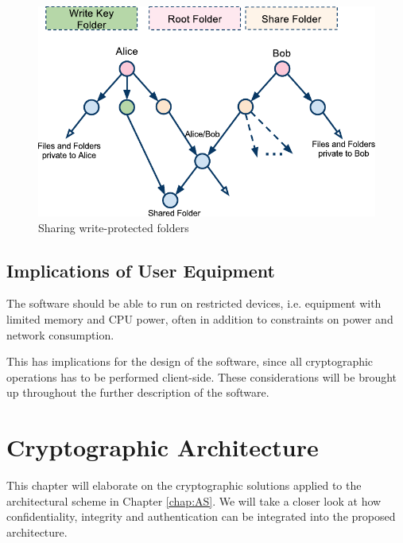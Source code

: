 \documentclass[pdftex,english,10pt,b5paper,twoside]{book}
\begin{document}
\begin{figure}[h!]
    \centering
    \includegraphics[width=\columnwidth]{ArchitectureShareReadOnlyFolder.pdf}
    \caption{Sharing write-protected folders}
    \label{fig:AS:readonly}
\end{figure}

\section{Implications of User Equipment}

The software should be able to run on restricted devices, i.e. equipment with
limited memory and \ac{CPU} power, often in addition to constraints on power and
network consumption.

This has implications for the design of the software, since all cryptographic
operations has to be performed client-side. These considerations will be
brought up throughout the further description of the software.

\chapter{Cryptographic Architecture}
\label{chap:CS}
This chapter will elaborate on the cryptographic solutions applied to the
architectural scheme in Chapter \ref{chap:AS}. We will take a closer look at
how confidentiality, integrity and authentication can be integrated into the
proposed architecture.

\end{document}
